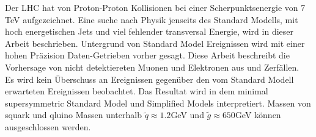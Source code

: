 Der LHC hat \lumi von Proton-Proton Kollisionen bei einer Scherpunktsenergie von 7 TeV aufgezeichnet. Eine suche nach Physik jenseits des Standard Modells, mit hoch energetischen Jets und viel fehlender transversal Energie, wird in dieser Arbeit beschrieben. Untergrund von Standard Model Ereignissen wird mit einer hohen Pr\"{a}zision Daten-Getrieben vorher gesagt. Diese Arbeit beschreibt die Vorhersage von nicht detektiereten Muonen und Elektronen aus  \ttbar und \wpj Zerf\"{a}llen.\\
Es wird kein \"{U}berschuss an Ereignissen gegen\"{u}ber den vom Standard Modell erwarteten Ereignissen beobachtet. Das Resultat wird in dem minimal supersymmetric Standard Model und Simplified Models interpretiert. Massen von squark und qluino Massen unterhalb $\tilde q \approx 1.2$GeV und $\tilde g \approx 650$GeV k\"{o}nnen ausgeschlossen werden.